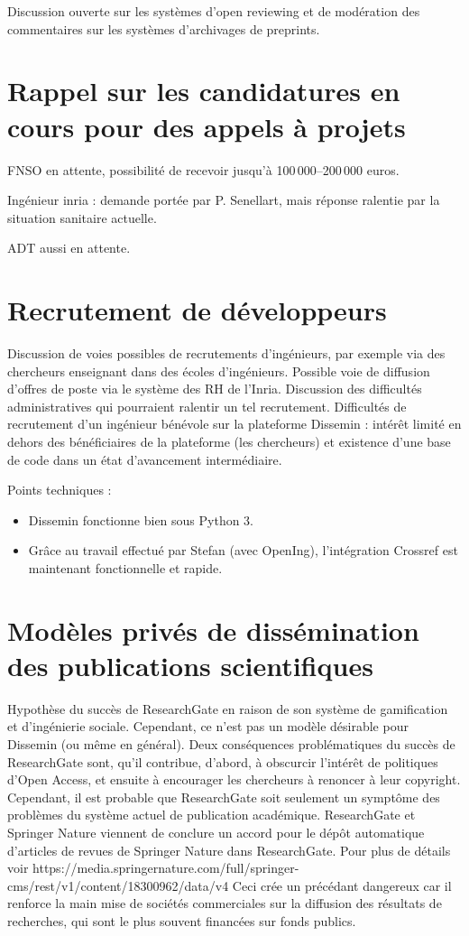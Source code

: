 \documentclass[a4paper]{article}
\begin{document}
Discussion ouverte sur les systèmes d'open reviewing et de modération des commentaires sur les systèmes d'archivages de preprints. 

\section{Rappel sur les candidatures en cours pour des appels à projets}
FNSO en attente, possibilité de recevoir jusqu'à 100\,000--200\,000 euros. 

Ingénieur inria : demande portée par P. Senellart, mais réponse ralentie par la situation sanitaire actuelle.

ADT aussi en attente. 

\section{Recrutement de développeurs}
Discussion de voies possibles de recrutements d'ingénieurs, par exemple via des chercheurs enseignant dans des écoles d'ingénieurs. Possible voie de diffusion d'offres de poste via le système des RH de l'Inria. Discussion des difficultés administratives qui pourraient ralentir un tel recrutement. Difficultés de recrutement d'un ingénieur bénévole sur la plateforme Dissemin : intérêt limité en dehors des bénéficiaires de la plateforme (les chercheurs) et existence d'une base de code dans un état d'avancement intermédiaire.


Points techniques : \begin{itemize}
\item Dissemin fonctionne bien sous Python 3. 
\item Grâce au travail effectué par Stefan (avec OpenIng), l'intégration Crossref est maintenant fonctionnelle et rapide. 
\end{itemize}

\section{Modèles privés de dissémination des publications scientifiques}

Hypothèse du succès de ResearchGate en raison de son système de gamification et d'ingénierie sociale. Cependant, ce n'est pas un modèle désirable pour Dissemin (ou même en général). Deux conséquences problématiques du succès de ResearchGate sont, qu'il contribue, d'abord, à obscurcir l'intérêt de politiques d'Open Access, et ensuite à encourager les chercheurs à renoncer à leur copyright. Cependant, il est probable que ResearchGate soit seulement un symptôme des problèmes du système actuel de publication académique.
ResearchGate et Springer Nature viennent de conclure un accord pour le dépôt automatique d'articles de revues de Springer Nature dans ResearchGate. Pour plus de détails voir https://media.springernature.com/full/springer-cms/rest/v1/content/18300962/data/v4
Ceci crée un précédant dangereux car il renforce la main mise de sociétés commerciales sur la diffusion des résultats de recherches, qui sont le plus souvent financées sur fonds publics.
\end{document}
